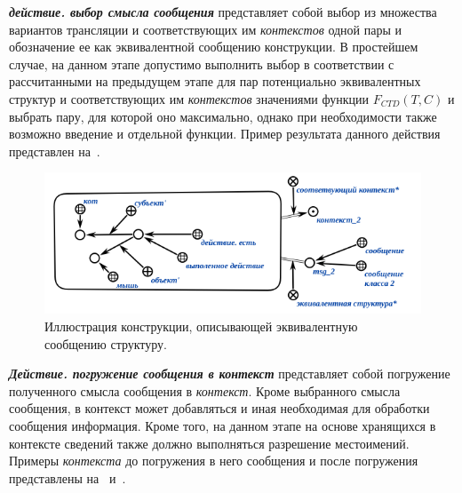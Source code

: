 \textbf{\textit{действие. выбор смысла сообщения}} представляет собой выбор из множества вариантов трансляции и соответствующих им \textit{контекстов} одной пары и обозначение ее как эквивалентной сообщению конструкции.
В простейшем случае, на данном этапе допустимо выполнить выбор в соответствии с рассчитанными на предыдущем этапе для пар потенциально эквивалентных структур и соответствующих им \textit{контекстов} значениями функции \textit{$F_{CTD}(T, C)$} и выбрать пару, для которой оно максимально, однако при необходимости также возможно введение и отдельной функции.
Пример результата данного действия представлен на~\textit{}.

\begin{figure}[h]
    \centering
    \includegraphics[scale=0.8]{images/part4/chapter_nl_interfaces/message_equivalent_structure}
    \caption{Иллюстрация конструкции, описывающей эквивалентную сообщению структуру.}
    \label{fig:message_equivalent_structure}
\end{figure}

\textbf{\textit{Действие. погружение сообщения в контекст}} представляет собой погружение полученного смысла сообщения в \textit{контекст}.
Кроме выбранного смысла сообщения, в контекст может добавляться и иная необходимая для обработки сообщения информация.
Кроме того, на данном этапе на основе хранящихся в контексте сведений также должно выполняться разрешение местоимений.
Примеры \textit{контекста} до погружения в него сообщения и после погружения представлены на~\textit{} и~\textit{}.

